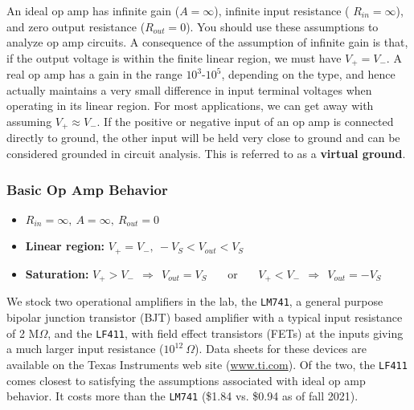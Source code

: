 \documentclass[11pt]{article}
\begin{document}
An ideal op amp has infinite gain ($A = \infty$), infinite input
resistance ( $R_{in} = \infty$), and zero output resistance ($R_{out}
= 0$). You should use these assumptions to analyze op amp circuits. A
consequence of the assumption of infinite gain is that, if the output
voltage is within the finite linear region, we must have $V_+ =
V_-$. A real op amp has a gain in the range $10^3$-$10^5$, depending
on the type, and hence actually maintains a very small difference in
input terminal voltages when operating in its linear region. For most
applications, we can get away with assuming $V_+ \approx V_-$. If the
positive or negative input of an op amp is connected directly to
ground, the other input will be held very close to ground and can be
considered grounded in circuit analysis. This is referred to as a
\textbf{virtual ground}.

\htmlrule
\begin{latexonly}
  \noindent
  \hrulefill
\end{latexonly}
\subsubsection*{Basic Op Amp Behavior}
\begin{itemize}
\item $R_{in} = \infty,~A = \infty,~R_{out} = 0$
\item \textbf{Linear region:} $V_+ = V_-,~-V_S < V_{out} < V_S$
\item \textbf{Saturation:} $V_+ > V_-~~\Longrightarrow~~V_{out} = V_S$
  ~~~or~~~ $V_+ < V_-~~\Longrightarrow~~V_{out} = -V_S$
\end{itemize}
\htmlrule
\begin{latexonly}
  \noindent
  \hrulefill
\end{latexonly}

We stock two operational amplifiers in the lab, the \texttt{LM741}, a
general purpose bipolar junction transistor (BJT) based amplifier with
a typical input resistance of 2 M$\Omega $, and the \texttt{LF411},
with field effect transistors (FETs) at the inputs giving a much
larger input resistance ($10^{12}~\Omega$). Data sheets for these
devices are available on the Texas Instruments web site
(\url{www.ti.com}). Of the two, the \texttt{LF411} comes closest to
satisfying the assumptions associated with ideal op amp behavior. It
costs more than the \texttt{LM741} (\$1.84 vs. \$0.94 as of fall
2021).
\end{document}
